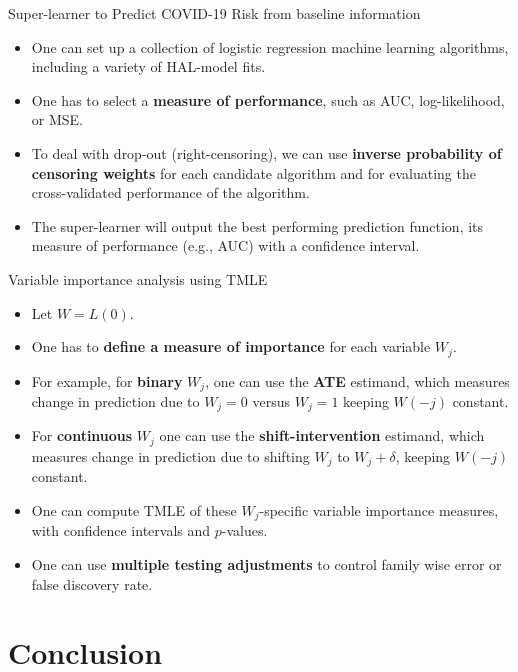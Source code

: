\documentclass[t]{beamer}
\begin{document}
\begin{frame}{Super-learner to Predict COVID-19 Risk from baseline information}
\begin{itemize}
\item One can set up a collection of logistic regression machine learning algorithms, including a variety of HAL-model fits.
\item One has to select a {\bf measure of performance}, such as AUC, log-likelihood, or MSE.
\item To deal with drop-out (right-censoring), we can use {\bf inverse probability of censoring weights} for each candidate algorithm and for evaluating the cross-validated performance of the algorithm.
\item The super-learner will output the best performing prediction function, its measure of performance (e.g., AUC) with a confidence interval.
\end{itemize}
\end{frame}

\begin{frame}{Variable importance analysis using TMLE}
\begin{itemize}
\item Let $W=L(0)$.
\item One has to {\bf define a measure of importance} for each variable $W_j$.
\item For example, for {\bf binary} $W_j$, one can use the {\bf ATE} estimand, which measures change in prediction due to $W_j=0$ versus $W_j=1$ keeping $W(-j)$ constant.
\item For {\bf continuous} $W_j$ one can use the {\bf shift-intervention} estimand, which measures change in prediction due to shifting  $W_j$ to $W_j+\delta$, keeping $W(-j)$ constant.
\item One can compute TMLE of these $W_j$-specific variable importance measures, with confidence intervals and $p$-values.
\item One can use {\bf multiple testing adjustments} to control family wise error or false discovery rate.
\end{itemize}
\end{frame}


\section{Conclusion}
\end{document}
